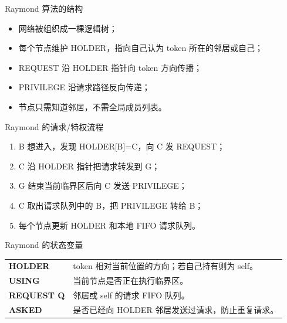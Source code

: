 \documentclass[UTF8,fontset=none,aspectratio=169,10pt]{beamer}
\begin{document}

\begin{frame}{Raymond 算法的结构}
\begin{itemize}
  \item 网络被组织成一棵逻辑树；
  \item 每个节点维护 HOLDER，指向自己认为 token 所在的邻居或自己；
  \item REQUEST 沿 HOLDER 指针向 token 方向传播；
  \item PRIVILEGE 沿请求路径反向传递；
  \item 节点只需知道邻居，不需全局成员列表。
\end{itemize}
\begin{center}
\end{center}
\end{frame}

\begin{frame}{Raymond 的请求/特权流程}
\begin{enumerate}
  \item B 想进入，发现 HOLDER[B]=C，向 C 发 REQUEST；
  \item C 沿 HOLDER 指针把请求转发到 G；
  \item G 结束当前临界区后向 C 发送 PRIVILEGE；
  \item C 取出请求队列中的 B，把 PRIVILEGE 转给 B；
  \item 每个节点更新 HOLDER 和本地 FIFO 请求队列。
\end{enumerate}
\end{frame}

\begin{frame}{Raymond 的状态变量}
\begin{tabularx}{\linewidth}{>{\bfseries}p{2.7cm}X}
\toprule
HOLDER & token 相对当前位置的方向；若自己持有则为 self。 \\
USING & 当前节点是否正在执行临界区。 \\
REQUEST Q & 邻居或 self 的请求 FIFO 队列。 \\
ASKED & 是否已经向 HOLDER 邻居发送过请求，防止重复请求。 \\
\bottomrule
\end{tabularx}
\vfill
{}
\end{frame}
\end{document}
